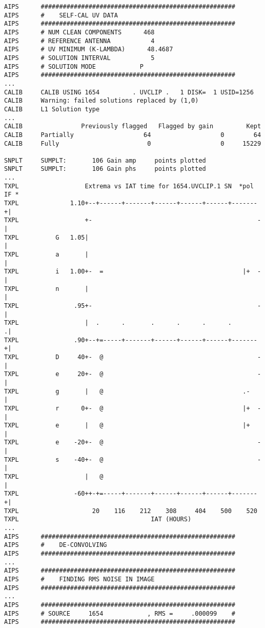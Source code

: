 \begin{verbatim}
AIPS      #####################################################
AIPS      #    SELF-CAL UV DATA
AIPS      #####################################################
AIPS      # NUM CLEAN COMPONENTS      468
AIPS      # REFERENCE ANTENNA           4
AIPS      # UV MINIMUM (K-LAMBDA)      48.4687
AIPS      # SOLUTION INTERVAL           5
AIPS      # SOLUTION MODE            P
AIPS      #####################################################
...
CALIB     CALIB USING 1654         . UVCLIP .   1 DISK=  1 USID=1256
CALIB     Warning: failed solutions replaced by (1,0)
CALIB     L1 Solution type
...
CALIB                Previously flagged   Flagged by gain         Kept
CALIB     Partially                   64                   0        64
CALIB     Fully                        0                   0     15229

SNPLT     SUMPLT:       106 Gain amp     points plotted
SNPLT     SUMPLT:       106 Gain phs     points plotted
...
TXPL                  Extrema vs IAT time for 1654.UVCLIP.1 SN  *pol IF *
TXPL              1.10+--+------+-------+------+------+------+-------+|
TXPL                  +-                                             -|
TXPL          G   1.05|                                               |
TXPL          a       |                                               |
TXPL          i   1.00+-  =                                      |+  -|
TXPL          n       |                                               |
TXPL               .95+-                                             -|
TXPL                  |  .      .       .      .      .      .       .|
TXPL               .90+--+=-----+-------+------+------+------+-------+|
TXPL          D     40+-  @                                          -|
TXPL          e     20+-  @                                          -|
TXPL          g       |   @                                      .-   |
TXPL          r      0+-  @                                      |+  -|
TXPL          e       |   @                                      |+   |
TXPL          e    -20+-  @                                          -|
TXPL          s    -40+-  @                                          -|
TXPL                  |   @                                           |
TXPL               -60++-+=-----+-------+------+------+------+-------+|
TXPL                    20    116    212    308     404    500    520
TXPL                                    IAT (HOURS)
...
AIPS      #####################################################
AIPS      #    DE-CONVOLVING
AIPS      #####################################################
...
AIPS      #####################################################
AIPS      #    FINDING RMS NOISE IN IMAGE
AIPS      #####################################################
...
AIPS      #####################################################
AIPS      # SOURCE     1654            , RMS =     .000099    #
AIPS      #####################################################
\end{verbatim}
